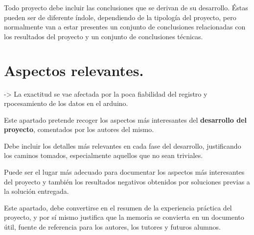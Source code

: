 
Todo proyecto debe incluir las conclusiones que se derivan de su desarrollo. Éstas pueden ser de diferente índole, dependiendo de la tipología del proyecto, pero normalmente van a estar presentes un conjunto de conclusiones relacionadas con los resultados del proyecto y un conjunto de conclusiones técnicas. 



\section{Aspectos relevantes.}



-> La exactitud se vae afectada por la poca fiabilidad del registro y rpocesamiento de los datos en el arduino.




Este apartado pretende recoger los aspectos más interesantes del \textbf{desarrollo del proyecto}, comentados por los autores del mismo.

Debe incluir los detalles más relevantes en cada fase del desarrollo, justificando los caminos tomados, especialmente aquellos que no sean triviales. 

Puede ser el lugar más adecuado para documentar los aspectos más interesantes del proyecto y también los resultados negativos obtenidos por soluciones previas a la solución entregada.

Este apartado, debe convertirse en el resumen de la experiencia práctica del proyecto, y por sí mismo justifica que la memoria se convierta en un documento útil, fuente de referencia para los autores, los tutores y futuros alumnos.




